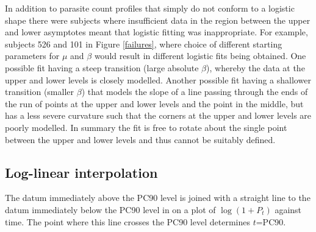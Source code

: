 In addition to parasite count profiles that simply do not conform to a logistic shape there were subjects where insufficient data in the region between the upper and lower asymptotes meant that logistic fitting was inappropriate. For example, subjects 526 and 101 in Figure \ref{failures}, where choice of different starting parameters for $\mu$ and $\beta$ would result in different logistic fits being obtained. One possible fit having a steep transition (large absolute $\beta$), whereby the data at the upper and lower levels is closely modelled. Another possible fit having a shallower transition (smaller $\beta$) that models the slope of a line passing through the ends of the run of points at the upper and lower levels and the point in the middle, but  has a less severe curvature such that the corners at the upper and lower levels are poorly modelled. In summary the fit is free to rotate about the single point between the upper and lower levels and thus cannot be suitably defined.

\subsection{Log-linear interpolation}
The datum immediately above the PC90 level is joined with a straight line to the datum immediately below the PC90 level in on a plot of $\log(1+P_{t})$ against time. The point where this line crosses the PC90 level determines $t$=PC90.

